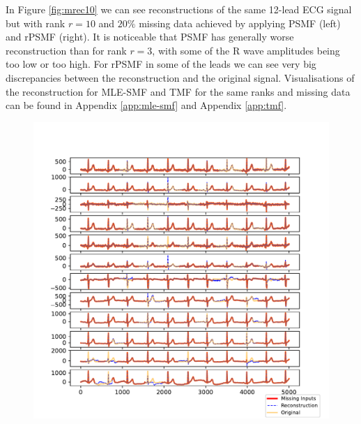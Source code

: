 \documentclass{mldsmsc}
\begin{document}
\noindent In Figure \ref{fig:mrec10} we can see reconstructions of the same 12-lead ECG signal but with rank $r = 10$ and $20\%$ missing data achieved by applying PSMF (left) and rPSMF (right). It is noticeable that PSMF has generally worse reconstruction than for rank $r = 3$, with some of the R wave amplitudes being too low or too high. For rPSMF in some of the leads we can see very big discrepancies between the reconstruction and the original signal. Visualisations of the reconstruction for MLE-SMF and TMF for the same ranks and missing data can be found in Appendix \ref{app:mle-smf} and Appendix \ref{app:tmf}.

\begin{figure}[H]
\centering
\begin{minipage}{0.4\linewidth}
    \centering
    \includegraphics[width=\linewidth]{images/missing/psmf_output_20_10.pdf}
    \label{fig:limp}
\end{minipage}%
\hspace{0.05\linewidth}
\begin{minipage}{0.4\linewidth}
    \centering

\end{minipage}
\end{figure}
\end{document}
